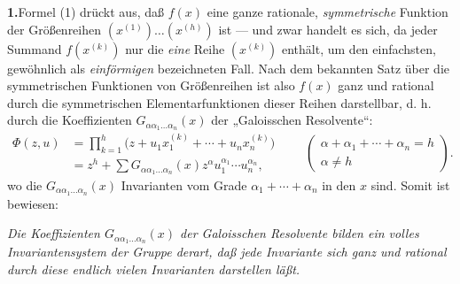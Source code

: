 \noindent\textbf{1.}\enspace Formel (1) drückt aus, daß $f(x)$ eine ganze rationale, \emph{symmetrische} Funktion der Größenreihen $(x^{(1)})\ldots(x^{(h)})$ ist --- und zwar handelt es sich, da jeder Summand $f(x^{(k)})$ nur die \emph{eine} Reihe $(x^{(k)})$ enthält, um den einfachsten, gewöhnlich als \emph{einförmigen} bezeichneten Fall. Nach dem bekannten Satz über die symmetrischen Funktionen von Größenreihen ist also $f(x)$ ganz und rational durch die symmetrischen Elementarfunktionen dieser Reihen darstellbar, d. h. durch die Koeffizienten $G_{\alpha\alpha_1\ldots\alpha_n}(x)$ der „Galoisschen Resolvente“:
\[
\begin{aligned}
  \Phi(z,u)
  &=\prod_{k=1}^{h}\bigl(z+u_1x_1^{(k)}+\cdots+u_nx_n^{(k)}\bigr) \\
  &=z^h+
    \sum G_{\alpha\alpha_1\ldots\alpha_n}(x)
    z^{\alpha}u_1^{\alpha_1}\cdots u_n^{\alpha_n},
\end{aligned}
\qquad
\left(\begin{array}{c}
\alpha+\alpha_1+\cdots+\alpha_n=h\\
\alpha\ne h
\end{array}\right).
\]
wo die $G_{\alpha\alpha_1\ldots\alpha_n}(x)$ Invarianten vom Grade $\alpha_1+\cdots+\alpha_n$ in den $x$ sind. Somit ist bewiesen:

\emph{Die Koeffizienten $G_{\alpha\alpha_1\ldots\alpha_n}(x)$ der Galoisschen Resolvente bilden ein volles Invariantensystem der Gruppe derart, daß jede Invariante sich ganz und rational durch diese endlich vielen Invarianten darstellen läßt.}

